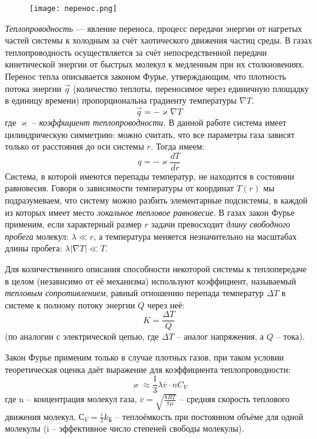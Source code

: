 \documentclass[a4paper,12pt]{article}
\begin{document}
\begin{figure}
    \begin{flushright}
    \vspace{-20pt}
        \texttt{[image: перенос.png]}
    \end{flushright}
\end{figure}
\textit{Теплопроводность} — явление переноса, процесс передачи энергии от нагретых частей системы к холодным за счёт хаотического движения частиц среды.
В газах теплопроводность осуществляется за счёт непосредственной передачи кинетической энергии от быстрых молекул к медленным при их столкновениях.
Перенос тепла описывается законом Фурье, утверждающим, что плотность потока энергии $\Vec{q}$ (количество теплоты, переносимое через единичную площадку в единицу времени) пропорциональна градиенту температуры $\nabla T$. 
\[\Vec{q} = -\varkappa\nabla T\]
где $\varkappa$ -- \textit{коэффициент теплопроводности.}
В данной работе система имеет цилиндрическую симметрию: можно считать, что все параметры газа зависят только от расстояния до оси системы $r$. Тогда имеем:
\[q = -\varkappa\frac{dT}{dr}\]
Система, в которой имеются перепады температур, не находится в состоянии равновесия. Говоря о зависимости температуры от координат $T(r)$ мы
подразумеваем, что систему можно разбить элементарные подсистемы, в каждой из которых имеет место \textit{локальное тепловое равновесие}. В газах закон Фурье применим, если характерный размер $r$ задачи превосходит \textit{длину свободного пробега} молекул: $\lambda \ll r$, а температура меняется
незначительно на масштабах длины пробега: $\lambda|\nabla T|\ll T$.

Для количественного описания способности некоторой системы к теплопередаче в целом (независимо от её механизма) используют коэффициент, называемый \textit{тепловым сопротивлением}, равный отношению перепада температур $\Delta T$ в системе к полному потоку энергии $Q$ через неё:
\[K = \frac{\Delta T}{Q}\]
(по аналогии с электрической цепью, где $\Delta T$ -- аналог напряжения, а $Q$ -- тока).

Закон Фурье применим только в случае плотных газов, при таком условии теоретическая оценка даёт выражение для коэффициента теплопроводности:
\[\varkappa \approx \frac{1}{3}\lambda \overline{v}\cdot n C_{V}\]
где n -- концентрация молекул газа, $\overline{v} = \sqrt{\frac{8RT}{\pi\mu}}$ -- средняя скорость теплового движения молекул, $С_{V} = \frac{i}{2} k_{Б}$ -- теплоёмкость при постоянном объёме для одной молекулы (i -- эффективное число степеней свободы молекулы).
\end{document}
